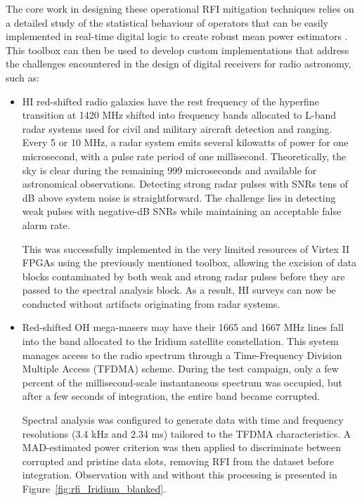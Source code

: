 \begin{itemize}
The core work in designing these operational RFI mitigation techniques relies on a detailed study of the statistical behaviour of operators that can be easily implemented in real-time digital logic to create robust mean power estimators \citep{dumezviou:tel-00319939}. This toolbox can then be used to develop custom implementations that address the challenges encountered in the design of digital receivers for radio astronomy, such as:

\begin{itemize}
\item HI red-shifted radio galaxies have the rest frequency of the hyperfine transition at 1420 MHz shifted into frequency bands allocated to L-band radar systems used for civil and military aircraft detection and ranging. Every 5 or 10 MHz, a radar system emits several kilowatts of power for one microsecond, with a pulse rate period of one millisecond. Theoretically, the sky is clear during the remaining 999 microseconds and available for astronomical observations. Detecting strong radar pulses with SNRs tens of dB above system noise is straightforward. The challenge lies in detecting weak pulses with negative-dB SNRs while maintaining an acceptable false alarm rate.

This was successfully implemented in the very limited resources of Virtex II FPGAs using the previously mentioned toolbox, allowing the excision of data blocks contaminated by both weak and strong radar pulses before they are passed to the spectral analysis block. As a result, HI surveys can now be conducted without artifacts originating from radar systems.


\item Red-shifted OH mega-masers may have their 1665 and 1667 MHz lines fall into the band allocated to the Iridium satellite constellation. This system manages access to the radio spectrum through a Time-Frequency Division Multiple Access (TFDMA) scheme. During the test campaign, only a few percent of the millisecond-scale instantaneous spectrum was occupied, but after a few seconds of integration, the entire band became corrupted.

Spectral analysis was configured to generate data with time and frequency resolutions (3.4 kHz and 2.34 ms) tailored to the TFDMA characteristics. A MAD-estimated power criterion was then applied to discriminate between corrupted and pristine data slots, removing RFI from the dataset before integration.  Observation with and without this processing is presented in Figure~\ref{fig:rfi_Iridium_blanked}.


\end{itemize}
\end{itemize}
